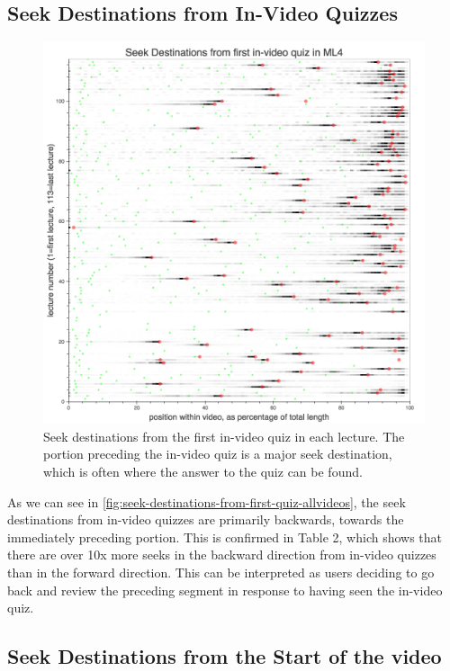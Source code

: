 \documentclass{sigchi}
\begin{document}

\subsection{Seek Destinations from In-Video Quizzes}

\begin{figure}
\includegraphics[width=1.0\columnwidth]{seek-destinations-from-first-quiz-allvideos}
\caption{Seek destinations from the first in-video quiz in each lecture. The portion preceding the in-video quiz is a major seek destination, which is often where the answer to the quiz can be found.}
\label{fig:seek-destinations-from-first-quiz-allvideos}
\end{figure}

As we can see in \autoref{fig:seek-destinations-from-first-quiz-allvideos}, the seek destinations from in-video quizzes are primarily backwards, towards the immediately preceding portion. This is confirmed in Table 2, which shows that there are over 10x more seeks in the backward direction from in-video quizzes than in the forward direction. This can be interpreted as users deciding to go back and review the preceding segment in response to having seen the in-video quiz.


\subsection{Seek Destinations from the Start of the video}
\end{document}
